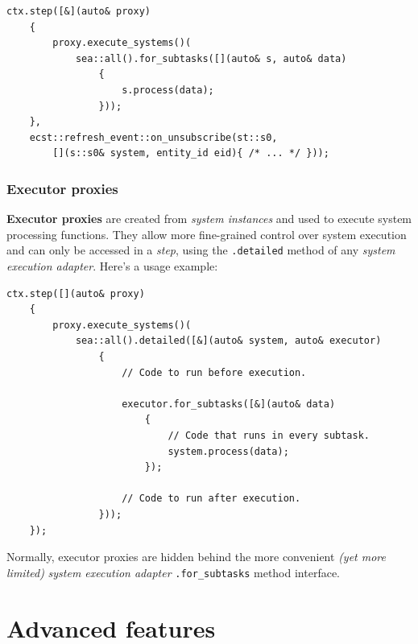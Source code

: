 \documentclass[oneside, 12pt, a4paper, openany]{book}
\begin{document}
\begin{verbatim}
ctx.step([&](auto& proxy)
    {
        proxy.execute_systems()(
            sea::all().for_subtasks([](auto& s, auto& data)
                {
                    s.process(data);
                }));
    },
    ecst::refresh_event::on_unsubscribe(st::s0,
        [](s::s0& system, entity_id eid){ /* ... */ }));
\end{verbatim}

\subsection{Executor proxies}\label{executor-proxies}

\textbf{Executor proxies} are created from \emph{system instances} and
used to execute system processing functions. They allow more
fine-grained control over system execution and can only be accessed in a
\emph{step}, using the
\texttt{.detailed}
method of any \emph{system execution adapter}. Here's a usage example:

\begin{verbatim}
ctx.step([](auto& proxy)
    {
        proxy.execute_systems()(
            sea::all().detailed([&](auto& system, auto& executor)
                {
                    // Code to run before execution.

                    executor.for_subtasks([&](auto& data)
                        {
                            // Code that runs in every subtask.
                            system.process(data);
                        });

                    // Code to run after execution.
                }));
    });
\end{verbatim}

Normally, executor proxies are hidden behind the more convenient
\emph{(yet more limited)} \emph{system execution adapter}
\texttt{.for_subtasks}
method interface.

\hypertarget{chap_advfeats}{\chapter{Advanced
features}\label{chap_advfeats}}
\end{document}
